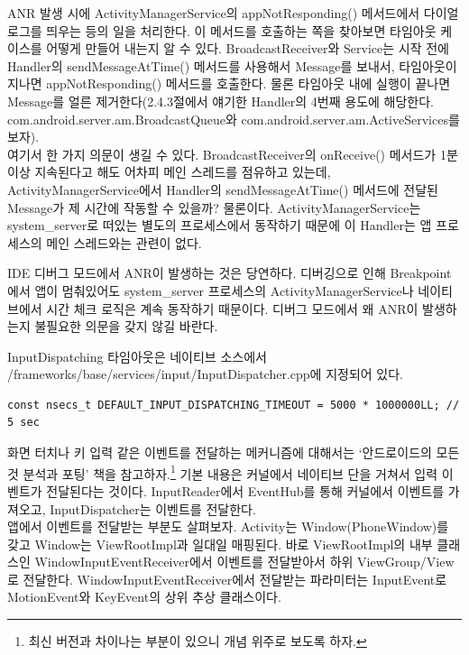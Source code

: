 ANR 발생 시에 ActivityManagerService의 appNotResponding() 메서드에서 다이얼로그를 띄우는 등의 일을 처리한다. 이 메서드를 호출하는 쪽을 찾아보면 타임아웃 케이스를 어떻게 만들어 내는지 알 수 있다.
BroadcastReceiver와 Service는 시작 전에 Handler의 sendMessageAtTime() 메서드를 사용해서 Message를 보내서, 타임아웃이 지나면 appNotResponding() 메서드를 호출한다. 물론 타임아웃 내에 실행이 끝나면 Message를 얼른 제거한다(2.4.3절에서 얘기한 Handler의 4번째 용도에 해당한다. com.android.server.am.BroadcastQueue와 com.android.server.am.ActiveServices를 보자).\\

여기서 한 가지 의문이 생길 수 있다. BroadcastReceiver의 onReceive() 메서드가 1분 이상 지속된다고 해도 어차피 메인 스레드를 점유하고 있는데, ActivityManagerService에서 Handler의 sendMessageAtTime() 메서드에 전달된 Message가 제 시간에 작동할 수 있을까? 
물론이다. ActivityManagerService는 system\_server로 떠있는 별도의 프로세스에서 동작하기 때문에 이 Handler는 앱 프로세스의 메인 스레드와는 관련이 없다.\\

\colorbox{tearose}{\parbox[t]{15cm}{
IDE 디버그 모드에서 ANR이 발생하는 것은 당연하다. 디버깅으로 인해 Breakpoint에서 앱이 멈춰있어도 system\_server 프로세스의 ActivityManagerService나 네이티브에서 시간 체크 로직은 계속 동작하기 때문이다. 디버그 모드에서 왜 ANR이 발생하는지 불필요한 의문을 갖지 않길 바란다.
}}\newline\newline

InputDispatching 타임아웃은 네이티브 소스에서 /frameworks/base/services/input/InputDispatcher.cpp에 지정되어 있다.
\begin{lstlisting}[frame=single] 
	const nsecs_t DEFAULT_INPUT_DISPATCHING_TIMEOUT = 5000 * 1000000LL; // 5 sec
\end{lstlisting}
화면 터치나 키 입력 같은 이벤트를 전달하는 메커니즘에 대해서는 `안드로이드의 모든 것 분석과 포팅' 책을 참고하자.\footnote{최신 버전과 차이나는 부분이 있으니 개념 위주로 보도록 하자.} 기본 내용은 커널에서 네이티브 단을 거쳐서 입력 이벤트가 전달된다는 것이다. InputReader에서 EventHub를 통해 커널에서 이벤트를 가져오고, InputDispatcher는 이벤트를 전달한다.\\

앱에서 이벤트를 전달받는 부분도 살펴보자. Activity는 Window(PhoneWindow)를 갖고 Window는 ViewRootImpl과 일대일 매핑된다. 바로 ViewRootImpl의 내부 클래스인 WindowInputEventReceiver에서 이벤트를 전달받아서 하위 ViewGroup/View로 전달한다. WindowInputEventReceiver에서 전달받는 파라미터는 InputEvent로 MotionEvent와 KeyEvent의 상위 추상 클래스이다.\\

